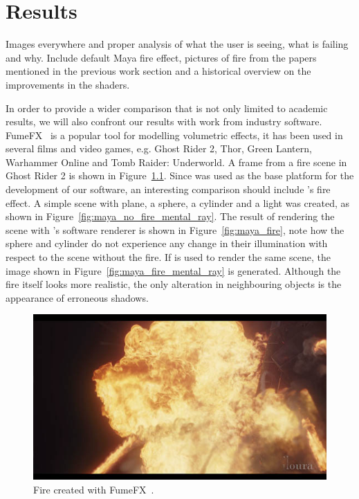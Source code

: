 \chapter{Results}
\label{ch:results}

Images everywhere and proper analysis of what the user is seeing, what is failing and why.
Include default Maya fire effect, pictures of fire from the papers mentioned in the previous work section and a historical overview on the improvements in the shaders.

In order to provide a wider comparison that is not only limited to academic results, we will also confront our results with work from industry software.
FumeFX~\cite{FumeFX} is a popular tool for modelling volumetric effects, it has been used in several films and video games, e.g. Ghost Rider 2, Thor, Green Lantern, Warhammer Online and Tomb Raider: Underworld.
A frame from a fire scene in Ghost Rider 2 is shown in Figure~\ref{fig:fumefx}.
Since \Maya was used as the base platform for the development of our software, an interesting comparison should include \Mayash's fire effect.
A simple scene with plane, a sphere, a cylinder and a light was created, as shown in Figure~\ref{fig:maya_no_fire_mental_ray}.
The result of rendering the scene with \Mayash's software renderer is shown in Figure~\ref{fig:maya_fire}, note how the sphere and cylinder do not experience any change in their illumination with respect to the scene without the fire.
If \MentalRay is used to render the same scene, the image shown in Figure~\ref{fig:maya_fire_mental_ray} is generated.
Although the fire itself looks more realistic, the only alteration in neighbouring objects  is the appearance of erroneous shadows.

\begin{figure}[htbp!]
	\centering
	\includegraphics[width=\textwidth]{img/fumefx}
	\caption{Fire created with FumeFX~\cite{FumeFX}.}
	\label{fig:fumefx}
\end{figure}

